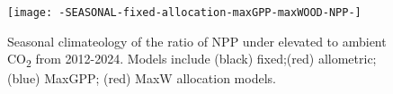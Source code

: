 \begin{figure}[h]
  \centering
    \texttt{[image: -SEASONAL-fixed-allocation-maxGPP-maxWOOD-NPP-]}
    \caption{Seasonal climateology of the ratio of NPP under elevated to ambient CO\textsubscript{2} from 2012-2024. Models include (black) fixed;(red) allometric; (blue) MaxGPP; (red) MaxW allocation models.}
\end{figure}